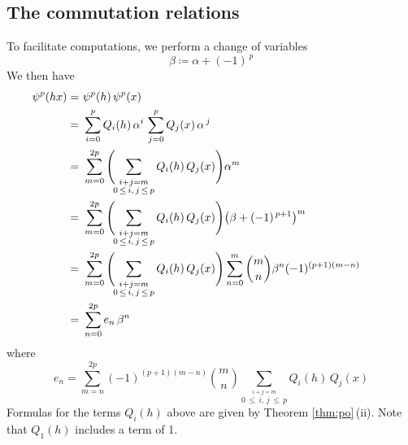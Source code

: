 \documentclass{gtpart}
\theoremstyle{definition}
\theoremstyle{remark}
\newcommand{\A}{\alpha}
\newcommand{\B}{\beta}
\newcommand{\ce}{\coloneqq}
\renewcommand{\=}{\approx}
\renewcommand{\-}{\sim}
\newcommand{\ch}[2]{{#1 \choose #2}}
\numberwithin{equation}{section}
\begin{document}
\subsection{The commutation relations}
\label{subsec:comm}

To facilitate computations, we perform a change of variables 
\[
 \B \ce \A + (-1)^{\,p} 
\]
We then have 
\[
 \begin{split}
  \psi^p(h x) = & ~ \psi^p(h) \, \psi^p(x) \hskip 7.7cm \\
              = & ~ \sum_{i = 0}^p Q_i(h) \, \A^i \, \sum_{j = 0}^p Q_j(x) \, 
                    \A^{\,j} \\
              = & ~ \sum_{m = 0}^{2 p} \Bigg(\!\! 
                    \sum_{\stackrel{\scriptstyle i + j = m}
                    {0 \,\leq\, i, \, j \,\leq\, p}} Q_i(h) \, Q_j(x) \Bigg) 
                    \A^m \\
              = & ~ \sum_{m = 0}^{2 p} \Bigg(\!\! 
                    \sum_{\stackrel{\scriptstyle i + j = m}
                    {0 \,\leq\, i, \, j \,\leq\, p}} Q_i(h) \, Q_j(x) \Bigg) 
                    \big(\B + (-1)^{\,p + 1}\big)^m \\
              = & ~ \sum_{m = 0}^{2 p} \Bigg(\!\! 
                    \sum_{\stackrel{\scriptstyle i + j = m}
                    {0 \,\leq\, i, \, j \,\leq\, p}} Q_i(h) \, Q_j(x) \Bigg) 
                    \sum_{n = 0}^m \ch{m}{n} \B^n (-1)^{(p + 1) (m - n)} \\
              = & ~ \sum_{n = 0}^{2 p} e_n \, \B^n 
 \end{split}
\]
where 
\[
  e_n = \sum_{m = n}^{2 p} (-1)^{(p + 1) (m - n)} \ch{m}{n} \! 
        \sum_{\stackrel{\scriptstyle i + j = m}{0 \,\leq\, i, \, j \,\leq\, p}} 
        Q_i(h) \, Q_j(x) 
\]
Formulas for the terms $Q_i(h)$ above are given by Theorem \ref{thm:po}\,(ii).  
Note that $Q_1(h)$ includes a term of 1.  
\end{document}
